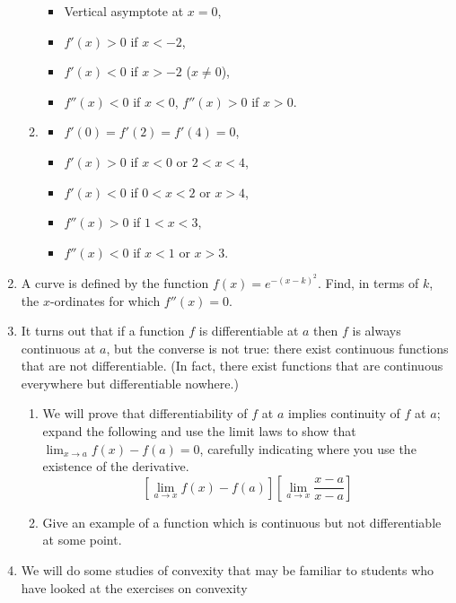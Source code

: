 \begin{enumerate}
\begin{enumerate}
\begin{itemize}
          \item Vertical asymptote at $ x = 0 $,
          \item $ f'(x) > 0 $ if $ x < -2 $,
          \item $ f'(x) < 0 $ if $ x > -2 $ ($ x \neq 0 $),
          \item $ f''(x) < 0 $ if $ x < 0 $, $ f''(x) > 0 $ if $ x > 0 $.
        \end{itemize}
      \item
        \begin{itemize}
          \item $ f'(0) = f'(2) = f'(4) = 0 $,
          \item $ f'(x) > 0 $ if $ x < 0 $ or $ 2 < x < 4 $,
          \item $ f'(x) < 0 $ if $ 0 < x < 2 $ or $ x > 4 $,
          \item $ f''(x) > 0 $ if $ 1 < x < 3 $,
          \item $ f''(x) < 0 $ if $ x < 1 $ or $ x > 3 $.
        \end{itemize}
    \end{enumerate}
  \item A curve is defined by the function $ f(x) = e^{-(x-k)^2} $. Find, in terms of $ k $, the $ x$-ordinates for which $ f''(x) = 0 $.
  \item It turns out that if a function $ f $ is differentiable at $ a $ then $ f $ is always continuous at $ a $, but the converse
        is not true: there exist continuous functions that are not differentiable. (In fact, there exist functions that are continuous
        everywhere but differentiable nowhere.) \label{exercise:contnotdif}
    \begin{enumerate}
      \item We will prove that differentiability of $ f $ at $ a $ implies continuity of $ f $ at $ a $; expand the following
            and use the limit laws to show that $ \lim_{x \to a} f(x) - f(a) = 0 $, carefully indicating where you use the existence
            of the derivative.
            \begin{displaymath}
              \left[\lim_{a \to x} f(x) - f(a)\right]\left[\lim_{a \to x} \frac{x - a}{x - a}\right]
            \end{displaymath}
      \item Give an example of a function which is continuous but not differentiable at some point.
    \end{enumerate}
  \item We will do some studies of convexity that may be familiar to students who have looked at the exercises on convexity

\end{enumerate}
